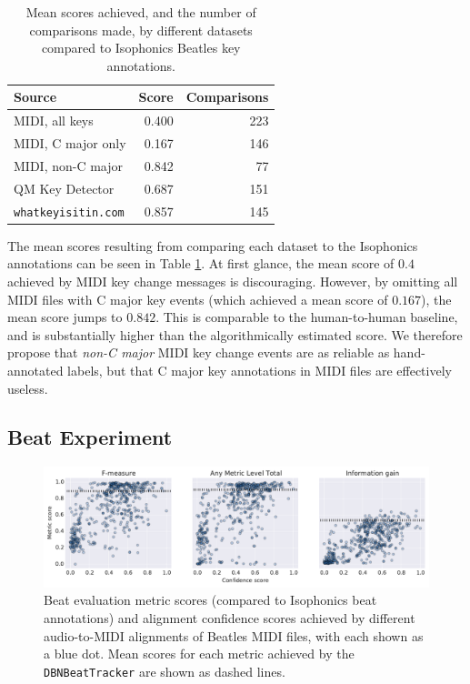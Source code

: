 \documentclass{article}
\begin{document}
\begin{table}
\begin{center}
\begin{tabular}{lrr}
  \toprule
  Source                     & Score & Comparisons \\
  \midrule
  MIDI, all keys             & 0.400 &         223 \\
  MIDI, C major only         & 0.167 &         146 \\
  MIDI, non-C major          & 0.842 &          77 \\
  QM Key Detector            & 0.687 &         151 \\
  \texttt{whatkeyisitin.com} & 0.857 &         145 \\
  \bottomrule
\end{tabular}
\end{center}
  \caption{Mean scores achieved, and the number of comparisons made, by different datasets compared to Isophonics Beatles key annotations.}
  \label{tab:key}
\end{table}

The mean scores resulting from comparing each dataset to the Isophonics annotations can be seen in Table \ref{tab:key}.
At first glance, the mean score of $0.4$ achieved by MIDI key change messages is discouraging. 
However, by omitting all MIDI files with C major key events (which achieved a mean score of $0.167$), the mean score jumps to $0.842$.
This is comparable to the human-to-human baseline, and is substantially higher than the algorithmically estimated score.
We therefore propose that \textit{non-C major} MIDI key change events are as reliable as hand-annotated labels, but that C major key annotations in MIDI files are effectively useless.

\subsection{Beat Experiment}

\begin{figure}
    \centerline{
    \includegraphics[width=\textwidth]{beat_scores.pdf}}
    \caption{Beat evaluation metric scores (compared to Isophonics beat annotations) and alignment confidence scores achieved by different audio-to-MIDI alignments of Beatles MIDI files, with each shown as a blue dot.
Mean scores for each metric achieved by the \texttt{DBNBeatTracker} \cite{bock2014multi} are shown as dashed lines.}
    \label{fig:beat}
\end{figure}
\end{document}
